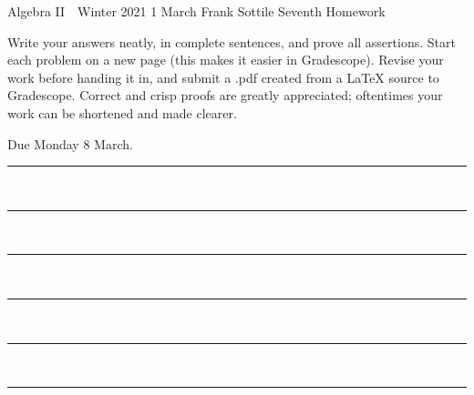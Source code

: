 \documentclass[12pt]{article}
\newcommand{\barsl}{\noindent\begin{minipage}[t]{575pt}
{\color{violet}\rule{575pt}{1.2pt}}\vspace{-5.7mm}\\
{\color{blue}\rule{575pt}{1.2pt}}\vspace{-5.7mm}\\
{\color{green}\rule{575pt}{1.2pt}}\vspace{-5.7mm}\\
{\color{yellow}\rule{575pt}{1.2pt}}\vspace{-5.7mm}\\
{\color{orange}\rule{575pt}{1.2pt}}\vspace{-5.7mm}\\
{\color{red}\rule{575pt}{1.2pt}}
\end{minipage}}
\begin{document}
\LARGE 
\noindent
Algebra II\ \ Winter 2021 \hfill 1 March\makebox[40pt][l]{\ }\newline
Frank Sottile \hfill
\Large\sf
Seventh Homework\makebox[40pt][l]{\ }
\vspace{5pt}
\normalsize

\noindent
Write your answers neatly, in complete sentences, and prove all assertions.
Start each problem on a new page (this makes it easier in Gradescope).
Revise your work before handing it in, and submit a .pdf  created from a LaTeX source to Gradescope.
Correct and crisp proofs are greatly appreciated; oftentimes your work can be shortened and made clearer.

\noindent
{\color{red}Due Monday 8 March.}\vspace{1pt}

\barsl
\end{document}
